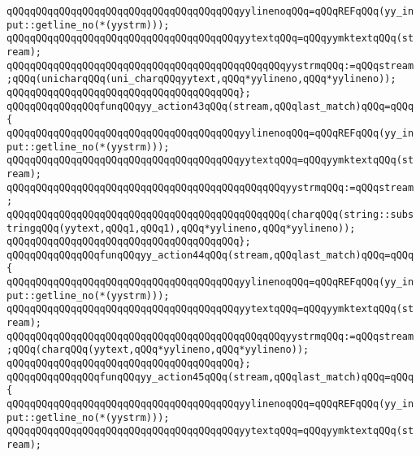 \verb|qQQqqQQqqQQqqQQqqQQqqQQqqQQqqQQqqQQqqQQqyylinenoqQQq=qQQqREFqQQq(yy_input::getline_no(*(yystrm)));|\newline
\verb|qQQqqQQqqQQqqQQqqQQqqQQqqQQqqQQqqQQqqQQqyytextqQQq=qQQqyymktextqQQq(stream);|\newline
\newline
\verb|qQQqqQQqqQQqqQQqqQQqqQQqqQQqqQQqqQQqqQQqqQQqqQQqyystrmqQQq:=qQQqstream;qQQq(unicharqQQq(uni_charqQQqyytext,qQQq*yylineno,qQQq*yylineno));|\newline
\verb|qQQqqQQqqQQqqQQqqQQqqQQqqQQqqQQqqQQqqQQq};|\newline
\verb|qQQqqQQqqQQqqQQqfunqQQqyy_action43qQQq(stream,qQQqlast_match)qQQq=qQQq{|\newline
\verb|qQQqqQQqqQQqqQQqqQQqqQQqqQQqqQQqqQQqqQQqyylinenoqQQq=qQQqREFqQQq(yy_input::getline_no(*(yystrm)));|\newline
\verb|qQQqqQQqqQQqqQQqqQQqqQQqqQQqqQQqqQQqqQQqyytextqQQq=qQQqyymktextqQQq(stream);|\newline
\newline
\verb|qQQqqQQqqQQqqQQqqQQqqQQqqQQqqQQqqQQqqQQqqQQqqQQqyystrmqQQq:=qQQqstream;|\newline
\verb|qQQqqQQqqQQqqQQqqQQqqQQqqQQqqQQqqQQqqQQqqQQqqQQq(charqQQq(string::substringqQQq(yytext,qQQq1,qQQq1),qQQq*yylineno,qQQq*yylineno));|\newline
\verb|qQQqqQQqqQQqqQQqqQQqqQQqqQQqqQQqqQQqqQQq};|\newline
\verb|qQQqqQQqqQQqqQQqfunqQQqyy_action44qQQq(stream,qQQqlast_match)qQQq=qQQq{|\newline
\verb|qQQqqQQqqQQqqQQqqQQqqQQqqQQqqQQqqQQqqQQqyylinenoqQQq=qQQqREFqQQq(yy_input::getline_no(*(yystrm)));|\newline
\verb|qQQqqQQqqQQqqQQqqQQqqQQqqQQqqQQqqQQqqQQqyytextqQQq=qQQqyymktextqQQq(stream);|\newline
\newline
\verb|qQQqqQQqqQQqqQQqqQQqqQQqqQQqqQQqqQQqqQQqqQQqqQQqyystrmqQQq:=qQQqstream;qQQq(charqQQq(yytext,qQQq*yylineno,qQQq*yylineno));|\newline
\verb|qQQqqQQqqQQqqQQqqQQqqQQqqQQqqQQqqQQqqQQq};|\newline
\verb|qQQqqQQqqQQqqQQqfunqQQqyy_action45qQQq(stream,qQQqlast_match)qQQq=qQQq{|\newline
\verb|qQQqqQQqqQQqqQQqqQQqqQQqqQQqqQQqqQQqqQQqyylinenoqQQq=qQQqREFqQQq(yy_input::getline_no(*(yystrm)));|\newline
\verb|qQQqqQQqqQQqqQQqqQQqqQQqqQQqqQQqqQQqqQQqyytextqQQq=qQQqyymktextqQQq(stream);|\newline
